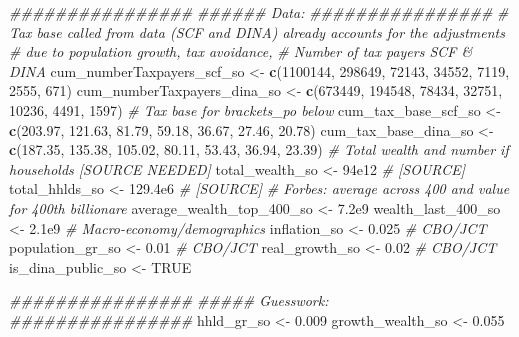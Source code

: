 \documentclass[]{article}
\newenvironment{Shaded}{\begin{snugshade}}{\end{snugshade}}
\newcommand{\CommentTok}[1]{\textcolor[rgb]{0.56,0.35,0.01}{\textit{#1}}}
\newcommand{\DecValTok}[1]{\textcolor[rgb]{0.00,0.00,0.81}{#1}}
\newcommand{\FloatTok}[1]{\textcolor[rgb]{0.00,0.00,0.81}{#1}}
\newcommand{\KeywordTok}[1]{\textcolor[rgb]{0.13,0.29,0.53}{\textbf{#1}}}
\newcommand{\NormalTok}[1]{#1}
\newcommand{\OtherTok}[1]{\textcolor[rgb]{0.56,0.35,0.01}{#1}}
\newcommand{\StringTok}[1]{\textcolor[rgb]{0.31,0.60,0.02}{#1}}
\begin{document}
\begin{Shaded}
\begin{Highlighting}[]
    \CommentTok{################}
    \CommentTok{###### Data:}
    \CommentTok{################ }
    \CommentTok{# Tax base called from data (SCF and DINA) already accounts for the adjustments}
    \CommentTok{# due to population growth, tax avoidance, }
    \CommentTok{# Number of tax payers SCF & DINA}
\NormalTok{    cum_numberTaxpayers_scf_so <-}\StringTok{ }\KeywordTok{c}\NormalTok{(}\DecValTok{1100144}\NormalTok{, }\DecValTok{298649}\NormalTok{, }\DecValTok{72143}\NormalTok{, }\DecValTok{34552}\NormalTok{, }\DecValTok{7119}\NormalTok{,  }\DecValTok{2555}\NormalTok{,  }\DecValTok{671}\NormalTok{)}
\NormalTok{    cum_numberTaxpayers_dina_so <-}\StringTok{ }\KeywordTok{c}\NormalTok{(}\DecValTok{673449}\NormalTok{, }\DecValTok{194548}\NormalTok{, }\DecValTok{78434}\NormalTok{, }\DecValTok{32751}\NormalTok{, }\DecValTok{10236}\NormalTok{, }\DecValTok{4491}\NormalTok{, }\DecValTok{1597}\NormalTok{) }
    \CommentTok{# Tax base for brackets_po below}
\NormalTok{    cum_tax_base_scf_so <-}\StringTok{  }\KeywordTok{c}\NormalTok{(}\FloatTok{203.97}\NormalTok{, }\FloatTok{121.63}\NormalTok{,  }\FloatTok{81.79}\NormalTok{, }\FloatTok{59.18}\NormalTok{, }\FloatTok{36.67}\NormalTok{, }\FloatTok{27.46}\NormalTok{, }\FloatTok{20.78}\NormalTok{)}
\NormalTok{    cum_tax_base_dina_so <-}\StringTok{ }\KeywordTok{c}\NormalTok{(}\FloatTok{187.35}\NormalTok{, }\FloatTok{135.38}\NormalTok{, }\FloatTok{105.02}\NormalTok{, }\FloatTok{80.11}\NormalTok{, }\FloatTok{53.43}\NormalTok{, }\FloatTok{36.94}\NormalTok{, }\FloatTok{23.39}\NormalTok{)}
    \CommentTok{# Total wealth and number if households [SOURCE NEEDED]}
\NormalTok{    total_wealth_so <-}\StringTok{ }\FloatTok{94e12}   \CommentTok{# [SOURCE]  }
\NormalTok{    total_hhlds_so <-}\StringTok{ }\FloatTok{129.4e6}  \CommentTok{# [SOURCE]}
    \CommentTok{# Forbes: average across 400 and value for 400th billionare}
\NormalTok{    average_wealth_top_}\DecValTok{400}\NormalTok{_so <-}\StringTok{ }\FloatTok{7.2e9}
\NormalTok{    wealth_last_}\DecValTok{400}\NormalTok{_so <-}\StringTok{ }\FloatTok{2.1e9}
    \CommentTok{# Macro-economy/demographics}
\NormalTok{    inflation_so <-}\StringTok{ }\FloatTok{0.025}      \CommentTok{# CBO/JCT}
\NormalTok{    population_gr_so <-}\StringTok{ }\FloatTok{0.01}   \CommentTok{# CBO/JCT}
\NormalTok{    real_growth_so <-}\StringTok{ }\FloatTok{0.02}     \CommentTok{# CBO/JCT}
\NormalTok{    is_dina_public_so <-}\StringTok{ }\OtherTok{TRUE}
    
    \CommentTok{################ }
    \CommentTok{#####  Guesswork:}
    \CommentTok{################ }
\NormalTok{    hhld_gr_so <-}\StringTok{ }\FloatTok{0.009}
\NormalTok{    growth_wealth_so <-}\StringTok{ }\FloatTok{0.055}


\end{Highlighting}
\end{Shaded}
\end{document}
